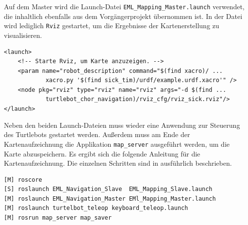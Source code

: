 Auf dem Master wird die Launch-Datei \lstinline{EML_Mapping_Master.launch}{} verwendet, die inhaltlich ebenfalls aus dem Vorgängerprojekt \cite{Turtleboys} übernommen ist. In der Datei wird lediglich \lstinline{Rviz}{} gestartet, um die Ergebnisse der Kartenerstellung zu visualisieren.
\begin{lstlisting}[caption={EML\_Mapping\_Master.launch},captionpos=b]
<launch>
	<!-- Starte Rviz, um Karte anzuzeigen. -->
	<param name="robot_description" command="$(find xacro)/ ...
			xacro.py '$(find sick_tim)/urdf/example.urdf.xacro'" />
	<node pkg="rviz" type="rviz" name="rviz" args="-d $(find ...
			turtlebot_chor_navigation)/rviz_cfg/rviz_sick.rviz"/>
</launch>
\end{lstlisting}
Neben den beiden Launch-Dateien muss wieder eine Anwendung zur Steuerung des Turtlebots gestartet werden. Außerdem muss am Ende der Kartenaufzeichnung die Applikation \lstinline{map_server}{} ausgeführt werden, um die Karte abzuspeichern. Es ergibt sich die folgende Anleitung für die Kartenaufzeichnung. Die einzelnen Schritten sind in \cite[S. 47 ff]{Turtleboys} ausführlich beschrieben.
\begin{lstlisting}[caption={Anleitung zur Kartenaufzeichnung},captionpos=b]
[M] roscore
[S] roslaunch EML_Navigation_Slave  EML_Mapping_Slave.launch
[M] roslaunch EML_Navigation_Master EMl_Mapping_Master.launch
[M] roslaunch turtelbot_teleop keyboard_teleop.launch
[M] rosrun map_server map_saver
\end{lstlisting}

\newpage
